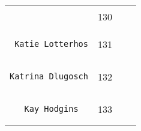\documentclass[]{article}
\begin{document}
\begin{longtable}[c]{@{}llll@{}}
\begin{minipage}[t]{0.39\columnwidth}
\begin{verbatim}
\end{verbatim}
\end{minipage} & \begin{minipage}[t]{0.10\columnwidth}\raggedright
130
\end{minipage} & \begin{minipage}[t]{0.13\columnwidth}\raggedright
\end{minipage} & \begin{minipage}[t]{0.15\columnwidth}\raggedright
\end{minipage}
\\\noalign{\medskip}
\begin{minipage}[t]{0.39\columnwidth}\raggedright
\begin{verbatim}
 Katie Lotterhos
\end{verbatim}
\end{minipage} & \begin{minipage}[t]{0.10\columnwidth}\raggedright
131
\end{minipage} & \begin{minipage}[t]{0.13\columnwidth}\raggedright
\end{minipage} & \begin{minipage}[t]{0.15\columnwidth}\raggedright
\end{minipage}
\\\noalign{\medskip}
\begin{minipage}[t]{0.39\columnwidth}\raggedright
\begin{verbatim}
Katrina Dlugosch
\end{verbatim}
\end{minipage} & \begin{minipage}[t]{0.10\columnwidth}\raggedright
132
\end{minipage} & \begin{minipage}[t]{0.13\columnwidth}\raggedright
\end{minipage} & \begin{minipage}[t]{0.15\columnwidth}\raggedright
\end{minipage}
\\\noalign{\medskip}
\begin{minipage}[t]{0.39\columnwidth}\raggedright
\begin{verbatim}
   Kay Hodgins
\end{verbatim}
\end{minipage} & \begin{minipage}[t]{0.10\columnwidth}\raggedright
133
\end{minipage} & \begin{minipage}[t]{0.13\columnwidth}\raggedright

\end{minipage}
\end{longtable}
\end{document}
